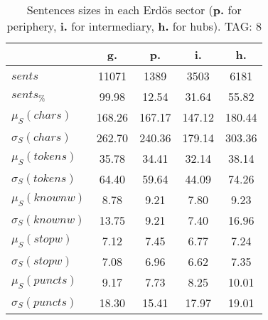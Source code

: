 \begin{table}[h!]
\begin{center}
\begin{tabular}{| l | c | c | c | c |}\hline
 & g. & p. & i. & h. \\\hline
$sents$ & 11071  & 1389  & 3503  & 6181 \\\hline
$sents_{\%}$ & 99.98  & 12.54  & 31.64  & 55.82 \\\hline
$\mu_S(chars)$ & 168.26  & 167.17  & 147.12  & 180.44 \\\hline
$\sigma_S(chars)$ & 262.70  & 240.36  & 179.14  & 303.36 \\\hline
$\mu_S(tokens)$ & 35.78  & 34.41  & 32.14  & 38.14 \\\hline
$\sigma_S(tokens)$ & 64.40  & 59.64  & 44.09  & 74.26 \\\hline
$\mu_S(knownw)$ & 8.78  & 9.21  & 7.80  & 9.23 \\\hline
$\sigma_S(knownw)$ & 13.75  & 9.21  & 7.40  & 16.96 \\\hline
$\mu_S(stopw)$ & 7.12  & 7.45  & 6.77  & 7.24 \\\hline
$\sigma_S(stopw)$ & 7.08  & 6.96  & 6.62  & 7.35 \\\hline
$\mu_S(puncts)$ & 9.17  & 7.73  & 8.25  & 10.01 \\\hline
$\sigma_S(puncts)$ & 18.30  & 15.41  & 17.97  & 19.01 \\\hline
\end{tabular}
\caption{Sentences sizes in each Erd\"os sector ({{\bf p.}} for periphery, {{\bf i.}} for intermediary, {{\bf h.}} for hubs). TAG: 8}
\end{center}
\end{table}